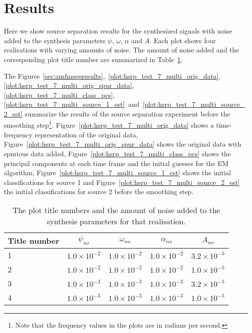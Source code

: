 \section{Results \label{sec:amfmsepresults}}

Here we show source separation results for the synthesized signals with 
noise added to the synthesis parameters $\psi$, $\omega$, $\alpha$
and $A$. Each plot shows four realisations with varying amounts of noise. The
amount of noise added and the corresponding plot title number are
summarized in Table~\ref{tab:amfmexpplotkey}.

The Figures~\ref{sec:amfmsepresults},~\ref{plot:hsrp_test_7_multi_orig_data},
\ref{plot:hsrp_test_7_multi_orig_spur_data},~%
\ref{plot:hsrp_test_7_multi_class_pcs},~%
\ref{plot:hsrp_test_7_multi_source_1_est}~and~\ref{plot:hsrp_test_7_multi_source_2_est}
summarize the results of the
source separation experiment before the smoothing step\footnote{Note that the
    frequency values in the plots are in radians per second.}.
Figure~\ref{plot:hsrp_test_7_multi_orig_data} shows a time-frequency
representation of the original data,
Figure~\ref{plot:hsrp_test_7_multi_orig_spur_data} shows the original data with
spurious data added, Figure~\ref{plot:hsrp_test_7_multi_class_pcs} shows the
principal components at each time frame and the initial guesses for the EM
algorithm, Figure~\ref{plot:hsrp_test_7_multi_source_1_est} shows the initial
classifications for source 1 and
Figure~\ref{plot:hsrp_test_7_multi_source_2_est} the initial classifications for
source 2 before the smoothing step.


\begin{table}
    \begin{center}
        \begin{tabular}{l c c c c}
            Title number & $\psi_{no}$ & $\omega_{no}$ & $\alpha_{no}$ &
            $A_{no}$ \\
            \hline
            1 & $1.0 \times 10^{-2}$ & $1.0 \times 10^{-2}$ & $1.0 \times 10^{-2}$ &
            $3.2 \times 10^{-5}$ \\
            2 & $1.0 \times 10^{-2}$ & $1.0 \times 10^{-2}$ & $1.0 \times 10^{-2}$ &
            $1.0 \times 10^{-5}$ \\
            3 & $1.0 \times 10^{-3}$ & $1.0 \times 10^{-3}$ & $1.0 \times 10^{-3}$ &
            $3.2 \times 10^{-5}$ \\
            4 & $1.0 \times 10^{-3}$ & $1.0 \times 10^{-3}$ & $1.0 \times 10^{-3}$ &
            $1.0 \times 10^{-5}$ \\
        \end{tabular}
    \end{center}
    \caption{The plot title numbers and the amount of noise added to the
    synthesis parameters for that realisation. \label{tab:amfmexpplotkey}}
\end{table}

